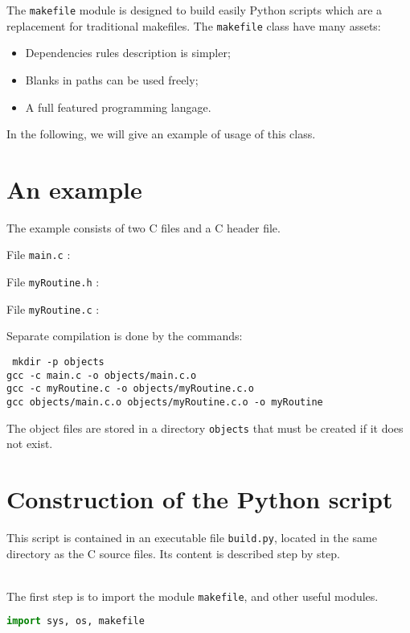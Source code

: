 \documentclass[a4paper,11pt]{extarticle}
\begin{document}
The \texttt{makefile} module is designed to build easily Python scripts which are a replacement for traditional makefiles. The \texttt{makefile} class have many assets:

\begin{itemize}
  \item Dependencies rules description is simpler;
  \item Blanks in paths can be used freely;
  \item A full featured programming langage. 
\end{itemize}

In the following, we will give an example of usage of this class.

\section{An example}

The example consists of two C files and a C header file.

File \texttt{main.c} :



File \texttt{myRoutine.h} :



File \texttt{myRoutine.c} :


Separate compilation is done by the commands:

\begin{mdframed}[hidealllines=true,backgroundcolor=lightgray!20]
\tt\footnotesize
mkdir -p objects\\
gcc -c main.c -o objects/main.c.o\\
gcc -c myRoutine.c -o objects/myRoutine.c.o\\
gcc objects/main.c.o objects/myRoutine.c.o -o myRoutine
\end{mdframed}


The object files are stored in a directory \texttt{objects} that must be created if it does not exist.


\section{Construction of the Python script}

This script is contained in an executable file \texttt{build.py}, located in the same directory as the C source files. Its content is described step by step.

~\\The first step is to import the module \texttt{makefile}, and other useful modules.
\begin{lstlisting}[language=py]
import sys, os, makefile
\end{lstlisting}
\end{document}
